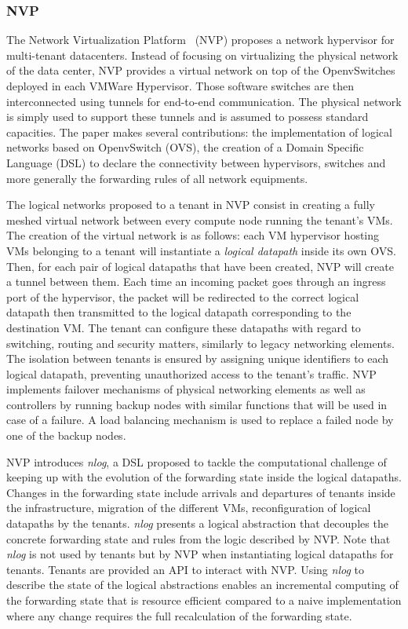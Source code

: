 \subsubsection{NVP}
The Network Virtualization Platform~\cite{NVP-Koponen2014} (NVP) proposes a network hypervisor for multi-tenant datacenters. Instead of focusing on virtualizing the physical network of the data center, NVP provides a virtual network on top of the OpenvSwitches~\cite{openvswitch} deployed in each VMWare Hypervisor. Those software switches are then interconnected using tunnels for end-to-end communication. 
The physical network is simply used to support these tunnels and is assumed to possess standard capacities.
The paper makes several contributions: the implementation of logical networks based on OpenvSwitch (OVS), the creation of a Domain Specific Language (DSL) to declare the connectivity between hypervisors, switches and more generally the forwarding rules of all network equipments.

The logical networks proposed to a tenant in NVP consist in creating a fully meshed virtual network between every compute node running the tenant's VMs.
The creation of the virtual network is as follows:
each VM hypervisor hosting VMs belonging to a tenant will instantiate a \textit{logical datapath} inside its own OVS. 
Then, for each pair of logical datapaths that have been created, NVP will create a tunnel between them.
Each time an incoming packet goes through an ingress port of the hypervisor, the packet will be redirected to the correct logical datapath then transmitted to the logical datapath corresponding to the destination VM.
The tenant can configure these datapaths with regard to switching, routing and security matters, similarly to legacy networking elements.
The isolation between tenants is ensured by assigning unique identifiers to each logical datapath, preventing unauthorized access to the tenant's traffic.
NVP implements failover mechanisms of physical networking elements as well as controllers by running backup nodes with similar functions that will be used in case of a failure.
A load balancing mechanism is used to replace a failed node by one of the backup nodes.

NVP introduces \textit{nlog}, a DSL proposed to tackle the computational challenge of keeping up with the evolution of the forwarding state inside the logical datapaths. Changes in the forwarding state include arrivals and departures of tenants inside the infrastructure, migration of the different VMs, reconfiguration of logical datapaths by the tenants. \textit{nlog} presents a logical abstraction that decouples the concrete forwarding state and rules from the logic described by NVP. Note that \textit{nlog} is not used by tenants but by NVP when instantiating logical datapaths for tenants.
Tenants are provided an API to interact with NVP.
Using \textit{nlog} to describe the state of the logical abstractions enables an incremental computing of the forwarding state that is resource efficient compared to a naive implementation where any change requires the full recalculation of the forwarding state.

